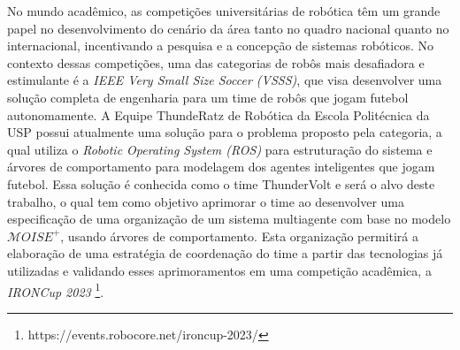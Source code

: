 \def \MOISEp {$\mathcal{M}OISE^+$} 

No mundo acadêmico, as competições universitárias de robótica têm um grande papel no desenvolvimento do cenário da área tanto no quadro nacional quanto no internacional, incentivando a pesquisa e a concepção de sistemas robóticos. No contexto dessas competições, uma das categorias de robôs mais desafiadora e estimulante é a \textit{IEEE Very Small Size Soccer (VSSS)}, que visa desenvolver uma solução completa de engenharia para um time de robôs que jogam futebol autonomamente. A Equipe ThundeRatz de Robótica da Escola Politécnica da USP possui atualmente uma solução para o problema proposto pela categoria, a qual utiliza o \textit{Robotic Operating System (ROS)} para estruturação do sistema e árvores de comportamento para modelagem dos agentes inteligentes que jogam futebol. Essa solução é conhecida como o time ThunderVolt e será o alvo deste trabalho, o qual tem como objetivo aprimorar o time ao desenvolver uma especificação de uma organização de um sistema multiagente com base no modelo \MOISEp, usando árvores de comportamento. Esta organização permitirá a elaboração de uma estratégia de coordenação do time a partir das tecnologias já utilizadas e validando esses aprimoramentos em uma competição acadêmica, a \textit{IRONCup 2023} \footnote{https://events.robocore.net/ironcup-2023/}.
